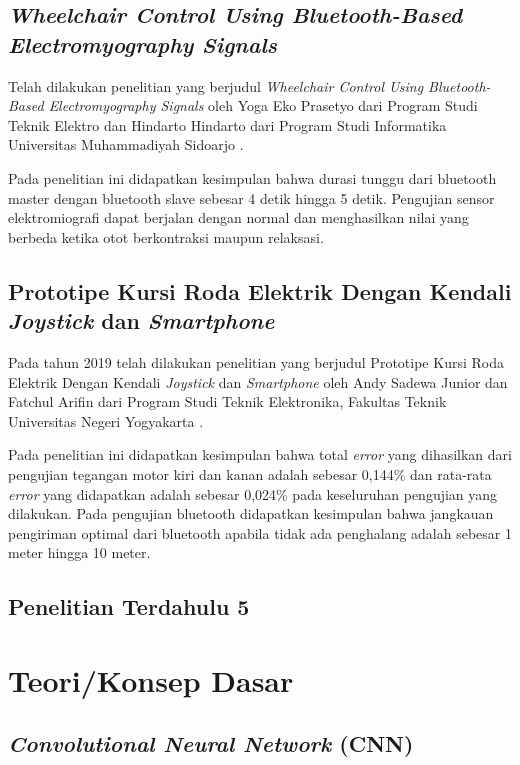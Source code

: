 \subsection{\emph{Wheelchair Control Using Bluetooth-Based Electromyography Signals}}
Telah dilakukan penelitian yang berjudul \emph{Wheelchair Control Using Bluetooth-Based Electromyography Signals} oleh Yoga Eko Prasetyo dari Program Studi Teknik Elektro dan Hindarto Hindarto dari Program Studi Informatika Universitas Muhammadiyah Sidoarjo \parencite{prasetyowheelchair}.

Pada penelitian ini didapatkan kesimpulan bahwa durasi tunggu dari bluetooth master dengan bluetooth slave sebesar 4 detik hingga 5 detik. Pengujian sensor elektromiografi dapat berjalan dengan normal dan menghasilkan nilai yang berbeda ketika otot berkontraksi maupun relaksasi. 

\subsection{Prototipe Kursi Roda Elektrik Dengan Kendali \emph{Joystick} dan \emph{Smartphone}}
Pada tahun 2019 telah dilakukan penelitian yang berjudul Prototipe Kursi Roda Elektrik Dengan Kendali \emph{Joystick} dan \emph{Smartphone} oleh Andy Sadewa Junior dan Fatchul Arifin dari Program Studi Teknik Elektronika, Fakultas Teknik Universitas Negeri Yogyakarta \parencite{junior2019prototipe}.

Pada penelitian ini didapatkan kesimpulan bahwa total \emph{error} yang dihasilkan dari pengujian tegangan motor kiri dan kanan adalah sebesar 0,144\% dan rata-rata \emph{error} yang didapatkan adalah sebesar 0,024\% pada keseluruhan pengujian yang dilakukan. Pada pengujian bluetooth didapatkan kesimpulan bahwa jangkauan pengiriman optimal dari bluetooth apabila tidak ada penghalang adalah sebesar 1 meter hingga 10 meter.

\subsection{Penelitian Terdahulu 5}

\section{Teori/Konsep Dasar}

\subsection{\emph{Convolutional Neural Network} (CNN)}

